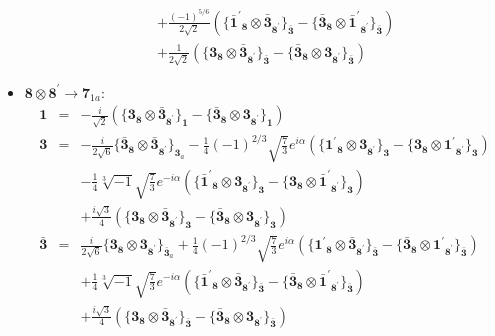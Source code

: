 \documentclass[english]{article}
\newcommand{\subcg}[3]{\big\{ {#1}\otimes{#2}\big\}^{}_{#3}}
\newcommand{\rep}[1]{\mathbf{#1}}
\begin{document}
\begin{itemize}
\begin{eqnarray*}
 & & +\frac{(-1)^{5/6}}{2 \sqrt{2}}\left(\subcg{\rep{\bar{1}^{\prime}}_{\rep{8}}}{\rep{\bar{3}}_{\rep{8^{\prime}}}}{\rep{\bar{3}}}-\subcg{\rep{\bar{3}}_{\rep{8}}}{\rep{\bar{1}^{\prime}}_{\rep{8^{\prime}}}}{\rep{\bar{3}}}\right) \\ 
 & & +\frac{1}{2 \sqrt{2}}\left(\subcg{\rep{3}_{\rep{8}}}{\rep{\bar{3}}_{\rep{8^{\prime}}}}{\rep{\bar{3}}}-\subcg{\rep{\bar{3}}_{\rep{8}}}{\rep{3}_{\rep{8^{\prime}}}}{\rep{\bar{3}}}\right)
\end{eqnarray*}
\item $\rep{8}\otimes\rep{8^{\prime}}\to\rep{7}_{1a}$:
\begin{eqnarray*}
\rep{1} &=& -\frac{i}{\sqrt{2}}\left(\subcg{\rep{3}_{\rep{8}}}{\rep{\bar{3}}_{\rep{8^{\prime}}}}{\rep{1}}-\subcg{\rep{\bar{3}}_{\rep{8}}}{\rep{3}_{\rep{8^{\prime}}}}{\rep{1}}\right)
\\
\rep{3} &=& -\frac{i}{2 \sqrt{6}}\subcg{\rep{\bar{3}}_{\rep{8}}}{\rep{\bar{3}}_{\rep{8^{\prime}}}}{\rep{3}_{a}}-\frac{1}{4} (-1)^{2/3} \sqrt{\frac{7}{3}} e^{i \alpha }\left(\subcg{\rep{1^{\prime}}_{\rep{8}}}{\rep{3}_{\rep{8^{\prime}}}}{\rep{3}}-\subcg{\rep{3}_{\rep{8}}}{\rep{1^{\prime}}_{\rep{8^{\prime}}}}{\rep{3}}\right) \\ 
 & & -\frac{1}{4} \sqrt[3]{-1} \sqrt{\frac{7}{3}} e^{-i \alpha }\left(\subcg{\rep{\bar{1}^{\prime}}_{\rep{8}}}{\rep{3}_{\rep{8^{\prime}}}}{\rep{3}}-\subcg{\rep{3}_{\rep{8}}}{\rep{\bar{1}^{\prime}}_{\rep{8^{\prime}}}}{\rep{3}}\right) \\ 
 & & +\frac{i \sqrt{3}}{4}\left(\subcg{\rep{3}_{\rep{8}}}{\rep{\bar{3}}_{\rep{8^{\prime}}}}{\rep{3}}-\subcg{\rep{\bar{3}}_{\rep{8}}}{\rep{3}_{\rep{8^{\prime}}}}{\rep{3}}\right)
\\
\rep{\bar{3}} &=& \frac{i}{2 \sqrt{6}}\subcg{\rep{3}_{\rep{8}}}{\rep{3}_{\rep{8^{\prime}}}}{\rep{\bar{3}}_{a}}+\frac{1}{4} (-1)^{2/3} \sqrt{\frac{7}{3}} e^{i \alpha }\left(\subcg{\rep{1^{\prime}}_{\rep{8}}}{\rep{\bar{3}}_{\rep{8^{\prime}}}}{\rep{\bar{3}}}-\subcg{\rep{\bar{3}}_{\rep{8}}}{\rep{1^{\prime}}_{\rep{8^{\prime}}}}{\rep{\bar{3}}}\right) \\ 
 & & +\frac{1}{4} \sqrt[3]{-1} \sqrt{\frac{7}{3}} e^{-i \alpha }\left(\subcg{\rep{\bar{1}^{\prime}}_{\rep{8}}}{\rep{\bar{3}}_{\rep{8^{\prime}}}}{\rep{\bar{3}}}-\subcg{\rep{\bar{3}}_{\rep{8}}}{\rep{\bar{1}^{\prime}}_{\rep{8^{\prime}}}}{\rep{\bar{3}}}\right) \\ 
 & & +\frac{i \sqrt{3}}{4}\left(\subcg{\rep{3}_{\rep{8}}}{\rep{\bar{3}}_{\rep{8^{\prime}}}}{\rep{\bar{3}}}-\subcg{\rep{\bar{3}}_{\rep{8}}}{\rep{3}_{\rep{8^{\prime}}}}{\rep{\bar{3}}}\right)

\end{eqnarray*}
\end{itemize}
\end{document}
